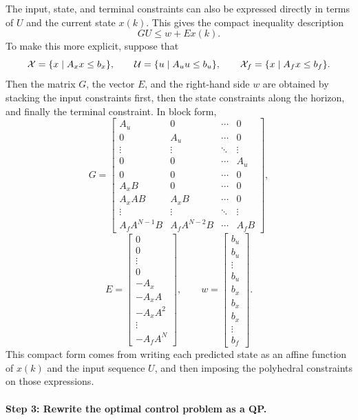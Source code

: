 The input, state, and terminal constraints can also be expressed directly in terms of \(U\) and
the current state \(x(k)\). This gives the compact inequality description
\[
GU \le w + Ex(k).
\]
To make this more explicit, suppose that
\[
\mathcal{X}=\{x\mid A_xx\le b_x\},\qquad
\mathcal{U}=\{u\mid A_uu\le b_u\},\qquad
\mathcal{X}_f=\{x\mid A_fx\le b_f\}.
\]
Then the matrix \(G\), the vector \(E\), and the right-hand side \(w\) are obtained by stacking
the input constraints first, then the state constraints along the horizon, and finally the terminal
constraint. In block form,
\[
G=
\begin{bmatrix}
A_u & 0 & \cdots & 0\\
0 & A_u & \cdots & 0\\
\vdots & \vdots & \ddots & \vdots\\
0 & 0 & \cdots & A_u\\
0 & 0 & \cdots & 0\\
A_xB & 0 & \cdots & 0\\
A_xAB & A_xB & \cdots & 0\\
\vdots & \vdots & \ddots & \vdots\\
A_fA^{N-1}B & A_fA^{N-2}B & \cdots & A_fB
\end{bmatrix},
\]
\[
E=
\begin{bmatrix}
0\\
0\\
\vdots\\
0\\
-A_x\\
-A_xA\\
-A_xA^2\\
\vdots\\
-A_fA^N
\end{bmatrix},
\qquad
w=
\begin{bmatrix}
b_u\\
b_u\\
\vdots\\
b_u\\
b_x\\
b_x\\
b_x\\
\vdots\\
b_f
\end{bmatrix}.
\]
This compact form comes from writing each predicted state as an affine function of \(x(k)\) and
the input sequence \(U\), and then imposing the polyhedral constraints on those expressions.

\paragraph{Step 3: Rewrite the optimal control problem as a QP.}


